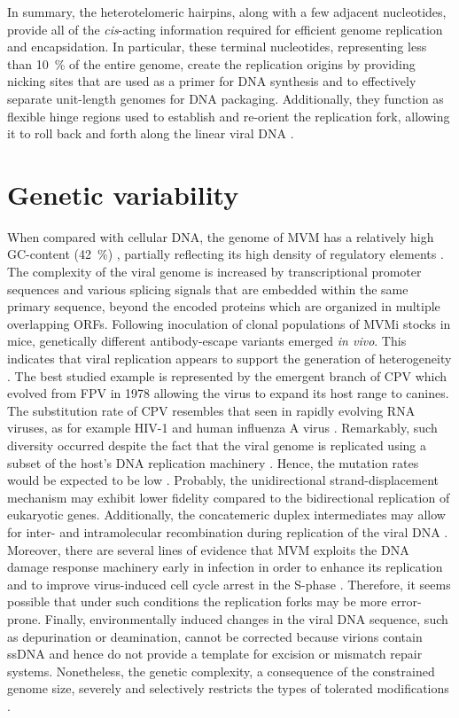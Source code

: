 In summary, the heterotelomeric hairpins, along with a few adjacent nucleotides, provide all of the \textit{cis}-acting information required for efficient genome replication and encapsidation. In particular, these terminal nucleotides, representing less than 10~\% of the entire genome, create the replication origins by providing nicking sites that are used as a primer for DNA synthesis and to effectively separate unit-length genomes for DNA packaging. Additionally, they function as flexible hinge regions used to establish and re-orient the replication fork, allowing it to roll back and forth along the linear viral DNA \cite{telomere2, telomere3, handbook, RHR}.        

\section{Genetic variability}

When compared with cellular DNA, the genome of MVM has a relatively high GC-content (42~\%) \cite{pmid6298737}, partially reflecting its high density of regulatory elements \cite{telomere}. The complexity of the viral genome is increased by transcriptional promoter sequences and various splicing signals that are embedded within the same primary sequence, beyond the encoded proteins which are organized in multiple overlapping ORFs. Following inoculation of clonal populations of MVMi stocks in mice, genetically different antibody-escape variants emerged \textit{in vivo}. This indicates that viral replication appears to support the generation of heterogeneity \cite{pmid12552010}. The best studied example is represented by the emergent branch of CPV which evolved from FPV in 1978 allowing the virus to expand its host range to canines. The substitution rate of CPV resembles that seen in rapidly evolving RNA viruses, as for example HIV-1 and human influenza A virus \cite{pmid15626758}. Remarkably, such diversity occurred despite the fact that the viral genome is replicated using a subset of the host's DNA replication machinery \cite{pmid8614999, pmid10792046}. Hence, the mutation rates would be expected to be low \cite{pmid15964835, pmid19540301}. Probably, the unidirectional strand-displacement mechanism may exhibit lower fidelity compared to the bidirectional replication of eukaryotic genes. Additionally, the concatemeric duplex intermediates may allow for inter- and intramolecular recombination during replication of the viral DNA \cite{telomere}. Moreover, there are several lines of evidence that MVM exploits the DNA damage response machinery early in infection in order to enhance its replication and to improve virus-induced cell cycle arrest in the S-phase \cite{pmid20949077}. Therefore, it seems possible that under such conditions the replication forks may be more error-prone. Finally, environmentally induced changes in the viral DNA sequence, such as depurination or deamination, cannot be corrected because virions contain ssDNA and hence do not provide a template for excision or mismatch repair systems. Nonetheless, the genetic complexity, a consequence of the constrained genome size, severely and selectively restricts the types of tolerated modifications \cite{telomere}.   

